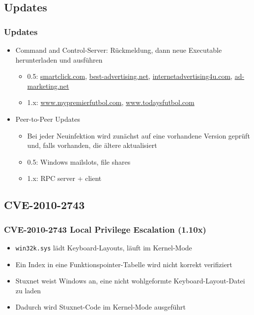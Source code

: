 \documentclass{beamer}
\begin{document}
\subsection{Updates}

\begin{frame}
  \frametitle{Updates}
  \begin{itemize}
    \item Command and Control-Server: Rückmeldung, dann neue Executable herunterladen und ausführen
      \begin{itemize}
        \item 0.5: \url{smartclick.com}, \url{best-advertising.net}, \url{internetadvertising4u.com}, \url{ad-marketing.net}
        \item 1.x: \url{www.mypremierfutbol.com}, \url{www.todaysfutbol.com}
      \end{itemize}
    \item Peer-to-Peer Updates
      \begin{itemize}
        \item Bei jeder Neuinfektion wird zunächst auf eine vorhandene Version geprüft und, falls vorhanden, die ältere aktualisiert
        \item 0.5: Windows mailslots, file shares
        \item 1.x: RPC server + client
      \end{itemize}
  \end{itemize}
\end{frame}

\subsection{CVE-2010-2743}

\begin{frame}
  \frametitle{CVE-2010-2743 Local Privilege Escalation (1.10x)}
  \begin{itemize}
    \item \texttt{win32k.sys} lädt Keyboard-Layouts, läuft im Kernel-Mode
    \item Ein Index in eine Funktionspointer-Tabelle wird nicht korrekt verifiziert
    \item Stuxnet weist Windows an, eine nicht wohlgeformte Keyboard-Layout-Datei zu laden
    \item Dadurch wird Stuxnet-Code im Kernel-Mode ausgeführt
  \end{itemize}
\end{frame}
\end{document}
